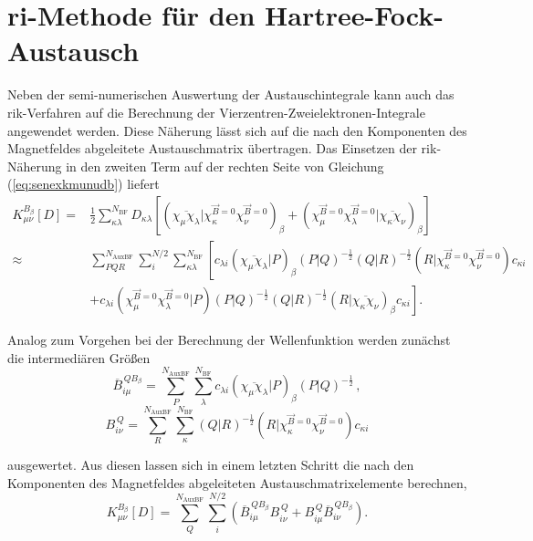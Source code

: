 \section{\acs{ri}-Methode für den Hartree-Fock-Austausch}
Neben der semi-numerischen Auswertung der Austauschintegrale kann auch das \ac{rik}-Verfahren auf die Berechnung der Vierzentren-Zweielektronen-Integrale angewendet werden.\supercite{weigend2002fully} Diese Näherung lässt sich auf die nach den Komponenten des Magnetfeldes abgeleitete Austauschmatrix übertragen. Das Einsetzen der \ac{rik}-Näherung in den zweiten Term auf der rechten Seite von Gleichung (\ref{eq:senexkmunudb}) liefert
\begin{equation}
\begin{aligned}
K_{\mu\nu}^{B_\beta}[D]=&\frac{1}{2}\sum_{\kappa\lambda}^{N_{\textrm{BF}}}D_{\kappa\lambda} \left[\left(\overline{\chi_\mu\chi_\lambda}\vert\chi_\kappa^{\vec{B}=0}\chi_\nu^{\vec{B}=0}\right)_\beta+\left(\chi_\mu^{\vec{B}=0}\chi_\lambda^{\vec{B}=0}\vert\overline{\chi_\kappa\chi_\nu}\right)_\beta\right]\\
\approx& \sum_{PQR}^{N_{\text{AuxBF}}}\sum_i^{N/2}\sum_{\kappa\lambda}^{N_{\textrm{BF}}}\left[ c_{\lambda i} \left(\overline{\chi_\mu\chi_\lambda}\vert P\right)_\beta\left(P\vert Q\right)^{-\frac{1}{2}} \left(Q\vert R\right)^{-\frac{1}{2}} \left(R \vert\chi_\kappa^{\vec{B}=0}\chi_\nu^{\vec{B}=0}\right)c_{\kappa i} \right.\\
&\left.+c_{\lambda i}\left(\chi_\mu^{\vec{B}=0}\chi_\lambda^{\vec{B}=0}\vert P\right)\left(P\vert Q\right)^{-\frac{1}{2}} \left(Q\vert R\right)^{-\frac{1}{2}} \left(R\vert\overline{\chi_\kappa\chi_\nu}\right)_\beta c_{\kappa i}\right].
\end{aligned}
\end{equation}

Analog zum Vorgehen bei der Berechnung der Wellenfunktion werden zunächst die intermediären Größen 
\begin{equation}
\overline{B}_{i\mu}^{\,QB_\beta}=\sum_P^{N_{\text{AuxBF}}}\sum_{\lambda}^{N_{\textrm{BF}}}c_{\lambda i} \left(\overline{\chi_\mu\chi_\lambda}\vert P\right)_\beta\left(P\vert Q\right)^{-\frac{1}{2}}\, ,
\end{equation}
\begin{equation}
B_{i\nu}^{\,Q}=\sum_R^{N_{\text{AuxBF}}}\sum_{\kappa}^{N_{\textrm{BF}}}\left(Q\vert R\right)^{-\frac{1}{2}} \left(R \vert\chi_\kappa^{\vec{B}=0}\chi_\nu^{\vec{B}=0}\right)c_{\kappa i}
\end{equation}

ausgewertet. Aus diesen lassen sich in einem letzten Schritt die nach den Komponenten des Magnetfeldes abgeleiteten Austauschmatrixelemente berechnen,
\begin{equation}
K_{\mu\nu}^{B_\beta}[D]=\sum_Q^{N_{\text{AuxBF}}}\sum_i^{N/2}\left(\overline{B}_{i\mu}^{\,QB_\beta} B_{i\nu}^{\,Q}+B_{i\mu}^{\,Q}\overline{B}_{i\nu}^{\,QB_\beta}\right).
\end{equation}